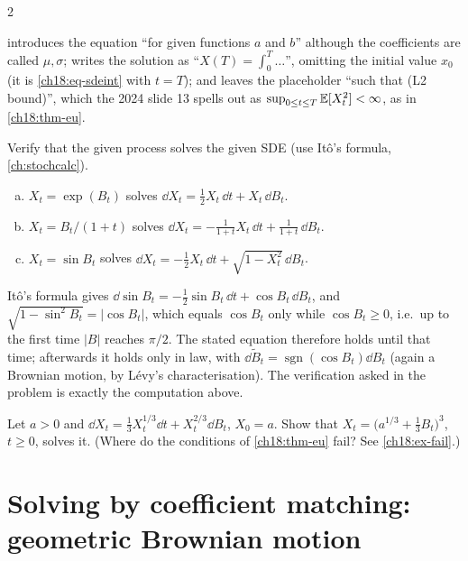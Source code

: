 \begin{paracol}{2}
\begin{coursenote}
 introduces the equation ``for given functions $a$ and $b$'' although the coefficients are called $\mu,\sigma$; writes the solution as ``$X(T)=\int_0^T\dots$'', omitting the initial value $x_0$ (it is \eqref{ch18:eq-sdeint} with $t=T$); and leaves the placeholder ``such that (L2 bound)'', which the 2024 slide 13 spells out as $\sup_{0\le t\le T}\mathbb{E}[X_t^2]<\infty$, as in \cref{ch18:thm-eu}.
\end{coursenote}

\begin{exercise}\label{ch18:ex-a1}
Verify that the given process solves the given SDE (use It\^o's formula, \cref{ch:stochcalc}).
\begin{enumerate}[(a)]
  \item $X_t=\exp(B_t)$ solves $\dd X_t=\tfrac12X_t\,\dd t+X_t\,\dd B_t$.
  \item $X_t=B_t/(1+t)$ solves $\dd X_t=-\frac1{1+t}X_t\,\dd t+\frac1{1+t}\,\dd B_t$.
  \item $X_t=\sin B_t$ solves $\dd X_t=-\tfrac12X_t\,\dd t+\sqrt{1-X_t^2}\,\dd B_t$.
\end{enumerate}
\end{exercise}
\begin{coursenote}
It\^o's formula gives $\dd\sin B_t=-\tfrac12\sin B_t\,\dd t+\cos B_t\,\dd B_t$, and $\sqrt{1-\sin^2B_t}=|\cos B_t|$, which equals $\cos B_t$ only while $\cos B_t\ge0$, i.e.\ up to the first time $|B|$ reaches $\pi/2$. The stated equation therefore holds until that time; afterwards it holds only in law, with $\dd\widetilde B_t=\operatorname{sgn}(\cos B_t)\dd B_t$ (again a Brownian motion, by L\'evy's characterisation). The verification asked in the problem is exactly the computation above.
\end{coursenote}

\begin{exercise}\label{ch18:ex-a2}
Let $a>0$ and $\dd X_t=\tfrac13X_t^{1/3}\dd t+X_t^{2/3}\dd B_t$, $X_0=a$. Show that $X_t=\bigl(a^{1/3}+\tfrac13B_t\bigr)^3$, $t\ge0$, solves it. (Where do the conditions of \cref{ch18:thm-eu} fail? See \cref{ch18:ex-fail}.)
\end{exercise}

\section{Solving by coefficient matching: geometric Brownian motion}\label{ch18:sec-cm}


\end{paracol}
